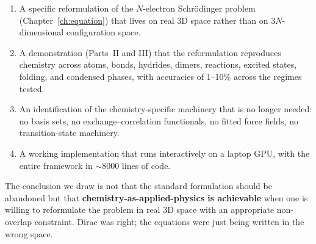 \begin{enumerate}
\item A specific reformulation of the $N$-electron Schr\"odinger problem (Chapter~\ref{ch:equation}) that lives on real 3D space rather than on $3N$-dimensional configuration space.
\item A demonstration (Parts~II and III) that the reformulation reproduces chemistry across atoms, bonds, hydrides, dimers, reactions, excited states, folding, and condensed phases, with accuracies of 1--10\% across the regimes tested.
\item An identification of the chemistry-specific machinery that is no longer needed: no basis sets, no exchange--correlation functionals, no fitted force fields, no transition-state machinery.
\item A working implementation that runs interactively on a laptop GPU, with the entire framework in $\sim$8000 lines of code.
\end{enumerate}

The conclusion we draw is not that the standard formulation should be abandoned but that \textbf{chemistry-as-applied-physics is achievable} when one is willing to reformulate the problem in real 3D space with an appropriate non-overlap constraint. Dirac was right; the equations were just being written in the wrong space.

